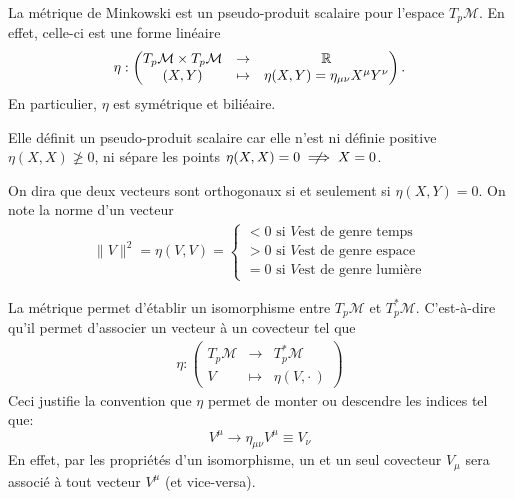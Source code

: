 \begin{theoremframe}
    \begin{defi}
        La métrique de Minkowski est un pseudo-produit scalaire pour l'espace $T_p\mathcal{M}$. En effet, celle-ci est une forme linéaire 
        \begin{align}
        \eta:\begin{pmatrix}
             T_p\mathcal{M} \times T_p\mathcal{M} & \to & \mathbb{R}\\
            (X,Y) & \mapsto & \eta(X,Y) = \eta_{\mu  \nu }X^{\mu}Y^{\nu}
        \end{pmatrix}.
        \end{align}
        En particulier, $\eta$ est symétrique et biliéaire.
    \end{defi}   
\end{theoremframe}
\begin{rmk}
    Elle définit un pseudo-produit scalaire car elle n'est ni définie positive $\eta(X,X) \ngeq 0$, ni sépare les points $\eta(X,X) = 0 \centernot \implies X = 0$.
\end{rmk}
On dira que deux vecteurs sont orthogonaux si et seulement si $\eta (X, Y) = 0$. On note la norme d'un vecteur
\begin{align*}
    \lVert V \rVert ^2 = \eta (V, V) = \left\{
\begin{array}{l}
  < 0 \text{ si } V \text{est de genre temps} \\
  > 0 \text{ si } V \text{est de genre espace}\\
  = 0 \text{ si } V \text{est de genre lumière}
\end{array}
\right.
\end{align*}

La métrique permet d'établir un isomorphisme entre $T_{p}\mathcal{M} $ et $T^*_{p}\mathcal{M}$. C'est-à-dire qu'il permet d'associer un vecteur à un covecteur tel que
\begin{align*}
    \eta : \begin{pmatrix}
        T_{p}\mathcal{M} &\to & T^*_{p}\mathcal{M}\\
             V &\mapsto &\eta (V, \cdot\,)
    \end{pmatrix}
\end{align*}
Ceci justifie la convention que $\eta$ permet de monter ou descendre les indices tel que:
\begin{equation*}
    V^{\mu} \rightarrow \eta_{\mu \nu}V^{\mu} \equiv V_{\nu}
\end{equation*}
En effet, par les propriétés d'un isomorphisme, un et un seul covecteur $V_\mu$ sera associé à tout vecteur $V^\mu$ (et vice-versa).
